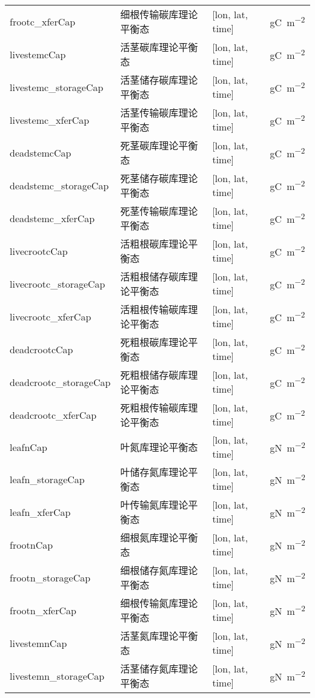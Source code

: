 {\begin{longtable}[htbp]{lp{}ll}
frootc\_xferCap & 细根传输碳库理论平衡态 & {[}lon, lat, time{]} & \unit{gC.m^{-2}} \\
livestemcCap & 活茎碳库理论平衡态 & {[}lon, lat, time{]}  & \unit{gC.m^{-2}} \\
livestemc\_storageCap & 活茎储存碳库理论平衡态 & {[}lon, lat, time{]} & \unit{gC.m^{-2}} \\
livestemc\_xferCap & 活茎传输碳库理论平衡态 & {[}lon, lat, time{]} & \unit{gC.m^{-2}} \\
deadstemcCap & 死茎碳库理论平衡态 & {[}lon, lat, time{]}  & \unit{gC.m^{-2}} \\
deadstemc\_storageCap  & 死茎储存碳库理论平衡态 & {[}lon, lat, time{]} & \unit{gC.m^{-2}} \\
deadstemc\_xferCap & 死茎传输碳库理论平衡态 & {[}lon, lat, time{]} & \unit{gC.m^{-2}} \\
livecrootcCap & 活粗根碳库理论平衡态 & {[}lon, lat, time{]}  & \unit{gC.m^{-2}} \\
livecrootc\_storageCap & 活粗根储存碳库理论平衡态 & {[}lon, lat, time{]} & \unit{gC.m^{-2}} \\
livecrootc\_xferCap   & 活粗根传输碳库理论平衡态 & {[}lon, lat, time{]} & \unit{gC.m^{-2}} \\
deadcrootcCap     & 死粗根碳库理论平衡态 & {[}lon, lat, time{]}  & \unit{gC.m^{-2}} \\
deadcrootc\_storageCap & 死粗根储存碳库理论平衡态 & {[}lon, lat, time{]}  & \unit{gC.m^{-2}} \\
deadcrootc\_xferCap   & 死粗根传输碳库理论平衡态 & {[}lon, lat, time{]} & \unit{gC.m^{-2}} \\
leafnCap        & 叶氮库理论平衡态 & {[}lon, lat, time{]}  & \unit{gN.m^{-2}} \\
leafn\_storageCap    & 叶储存氮库理论平衡态 & {[}lon, lat, time{]}  & \unit{gN.m^{-2}} \\
leafn\_xferCap     & 叶传输氮库理论平衡态 & {[}lon, lat, time{]}  & \unit{gN.m^{-2}} \\
frootnCap       & 细根氮库理论平衡态 & {[}lon, lat, time{]}  & \unit{gN.m^{-2}} \\
frootn\_storageCap   & 细根储存氮库理论平衡态 & {[}lon, lat, time{]} & \unit{gN.m^{-2}} \\
frootn\_xferCap     & 细根传输氮库理论平衡态 & {[}lon, lat, time{]} & \unit{gN.m^{-2}} \\
livestemnCap      & 活茎氮库理论平衡态 & {[}lon, lat, time{]}  & \unit{gN.m^{-2}} \\
livestemn\_storageCap  & 活茎储存氮库理论平衡态 & {[}lon, lat, time{]} & \unit{gN.m^{-2}} \\

\end{longtable}}
